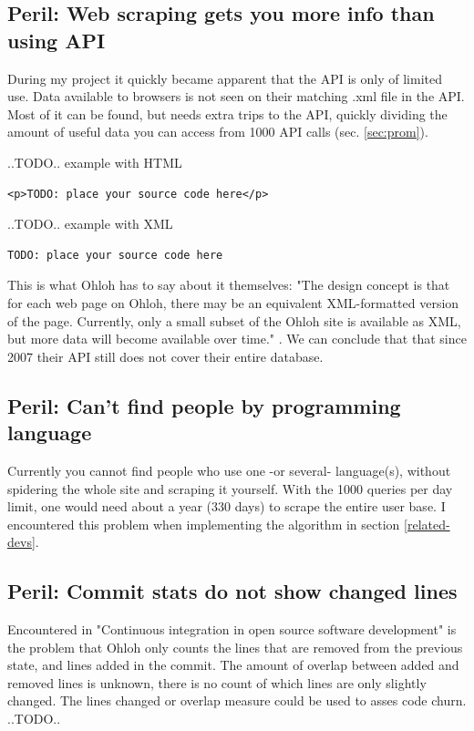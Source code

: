 \documentclass{sig-alternate}
\begin{document}
\subsection{Peril: Web scraping gets you more info than using API}
During my project it quickly became apparent that the API is only of limited use. Data available to browsers is not seen on their matching .xml file in the API. Most of it can be found, but needs extra trips to the API, quickly dividing the amount of useful data you can access from 1000 API calls (sec. \ref{sec:prom}).

..TODO.. example with HTML

\lstset{language=html}
\begin{lstlisting}
<p>TODO: place your source code here</p>
\end{lstlisting}

..TODO.. example with XML

\lstset{language=xml}
\begin{lstlisting}
TODO: place your source code here
\end{lstlisting}


This is what Ohloh has to say about it themselves: "The design concept is that for each web page on Ohloh, there may be an equivalent XML-formatted version of the page. Currently, only a small subset of the Ohloh site is available as XML, but more data will become available over time." \cite{ohloh-api}. We can conclude that that since 2007 their API still does not cover their entire database.



\subsection{Peril: Can't find people by programming language}
Currently you cannot find people who use one -or several- language(s), without spidering the whole site and scraping it yourself. With the 1000 queries per day limit, one would need about a year (330 days) to scrape the entire user base. I encountered this problem when implementing the algorithm in section \ref{related-devs}.


\subsection{Peril: Commit stats do not show changed lines}

Encountered in "Continuous integration in open source software development" \cite{Deshpande:2008p4463} is the problem that Ohloh only counts the lines that are removed from the previous state, and lines added in the commit. The amount of overlap between added and removed lines is unknown, there is no count of which lines are only slightly changed. The lines changed or overlap measure could be used to asses code churn. ..TODO..
\end{document}
